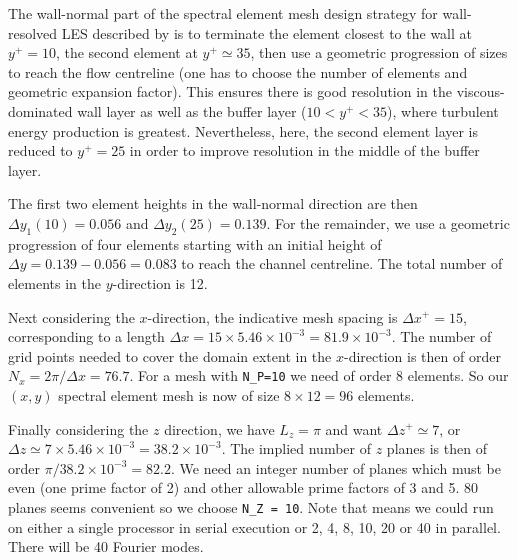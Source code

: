 \documentclass[11pt,a4paper]{report}
\begin{document}
The wall-normal part of the spectral element mesh design strategy for
wall-resolved LES described by \citet{blsc03} is to terminate the
element closest to the wall at $y^+=10$, the second element at
$y^+\simeq35$, then use a geometric progression of sizes to reach the
flow centreline (one has to choose the number of elements and
geometric expansion factor).  This ensures there is good resolution in
the viscous-dominated wall layer as well as the buffer layer
($10<y^+<35$), where turbulent energy production is greatest.
Nevertheless, here, the second element layer is reduced to $y^+ = 25$
in order to improve resolution in the middle of the buffer layer.

The first two element heights in the wall-normal direction are then
$\Delta y_1(10)=0.056$ and $\Delta y_2(25)=0.139$. For the remainder,
we use a geometric progression of four elements starting with an
initial height of $\Delta y = 0.139-0.056=0.083$ to reach the channel
centreline.  The total number of elements in the $y$-direction is 12.

Next considering the $x$-direction, the indicative mesh spacing is
$\Delta x^+=15$, corresponding to a length $\Delta x =
15\times5.46\times10^{-3}=81.9\times10^{-3}$.  The number of grid
points needed to cover the domain extent in the $x$-direction is then
of order $N_x=2\pi/\Delta x=76.7$.  For a mesh with \verb|N_P=10| we
need of order 8 elements.  So our $(x,y)$ spectral element mesh is now
of size $8\times12=96$ elements.

Finally considering the $z$ direction, we have $L_z=\pi$ and want
$\Delta z^+\simeq7$, or $\Delta
z\simeq7\times5.46\times10^{-3}=38.2\times10^{-3}$.  The implied
number of $z$ planes is then of order $\pi/38.2\times10^{-3}=82.2$.
We need an integer number of planes which must be even (one prime
factor of 2) and other allowable prime factors of 3 and 5.  80 planes
seems convenient so we choose \verb|N_Z = 10|.  Note that means we
could run on either a single processor in serial execution or 2, 4, 8,
10, 20 or 40 in parallel.  There will be 40 Fourier modes.

\end{document}
